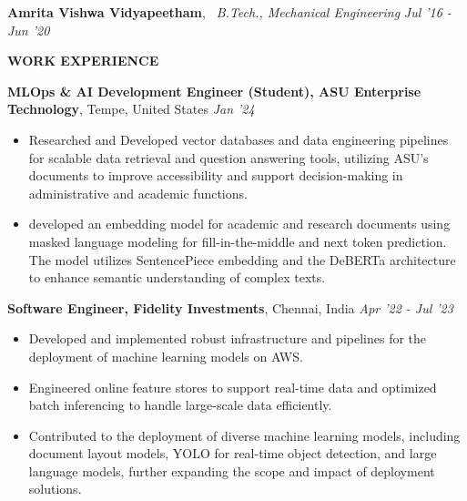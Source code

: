 \documentclass[10pt,a4]{article}
\def\hrulefill{\leavevmode\leaders\hrule height 1pt\hfill\kern 0pt}		%
\begin{document}
{\begin{flushleft}
    \vspace{1mm}

    
    \textbf{\large Amrita Vishwa Vidyapeetham}, \textit{\ B.Tech., Mechanical Engineering} \hfill \textit{ Jul '16 - Jun '20}	\\

\end{flushleft}
		
		
		
\begin{flushleft}
    {\Large \textbf{WORK EXPERIENCE}} %

    \vspace{1.5mm}
    \textbf{\large MLOps \& AI Development Engineer (Student), ASU Enterprise Technology},   Tempe, United States \hfill \textit{\large Jan '24}	\\
    \begin{itemize}
        \item Researched and Developed vector databases and data engineering pipelines for scalable data retrieval and question answering tools, utilizing ASU’s documents to improve accessibility and support decision-making in administrative and academic functions.
        \item developed an embedding model for academic and research documents using masked language modeling for fill-in-the-middle and next token prediction. The model utilizes SentencePiece embedding and the DeBERTa architecture to enhance semantic understanding of complex texts.
    \end{itemize}	
    \vspace{0.5mm}
    \textbf{\large Software Engineer, Fidelity Investments},  Chennai, India \hfill \textit{\large Apr '22 - Jul '23}	\\
    \begin{itemize}
        \item Developed and implemented robust infrastructure and pipelines for the deployment of machine learning models on AWS.  
         \item Engineered online feature stores to support real-time data and optimized batch inferencing to handle large-scale data efficiently.
         \item Contributed to the deployment of diverse machine learning models, including document layout models, YOLO for real-time object detection, and large language models, further expanding the scope and impact of deployment solutions.

\end{itemize}
\end{flushleft}}
\end{document}
